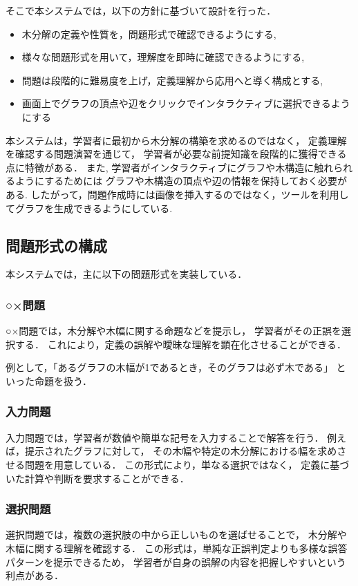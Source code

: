 \documentclass[technicalreport]{ieicej}
\begin{document}
そこで本システムでは，以下の方針に基づいて設計を行った．
\begin{itemize}
  \item 木分解の定義や性質を，問題形式で確認できるようにする,
  \item 様々な問題形式を用いて，理解度を即時に確認できるようにする, 
  \item 問題は段階的に難易度を上げ，定義理解から応用へと導く構成とする, 
  \item 画面上でグラフの頂点や辺をクリックでインタラクティブに選択できるようにする
\end{itemize}

本システムは，学習者に最初から木分解の構築を求めるのではなく，
定義理解を確認する問題演習を通じて，
学習者が必要な前提知識を段階的に獲得できる点に特徴がある．
また, 学習者がインタラクティブにグラフや木構造に触れられるようにするためには
グラフや木構造の頂点や辺の情報を保持しておく必要がある. 
したがって，問題作成時には画像を挿入するのではなく，ツールを利用してグラフを生成できるようにしている.

\subsection{問題形式の構成}
本システムでは，主に以下の問題形式を実装している．

\subsubsection{○×問題}
○×問題では，木分解や木幅に関する命題などを提示し，
学習者がその正誤を選択する．
これにより，定義の誤解や曖昧な理解を顕在化させることができる．

例として，「あるグラフの木幅が1であるとき，そのグラフは必ず木である」
といった命題を扱う．

\subsubsection{入力問題}
入力問題では，学習者が数値や簡単な記号を入力することで解答を行う．
例えば，提示されたグラフに対して，
その木幅や特定の木分解における幅を求めさせる問題を用意している．
この形式により，単なる選択ではなく，
定義に基づいた計算や判断を要求することができる．

\subsubsection{選択問題}
選択問題では，複数の選択肢の中から正しいものを選ばせることで，
木分解や木幅に関する理解を確認する．
この形式は，単純な正誤判定よりも多様な誤答パターンを提示できるため，
学習者が自身の誤解の内容を把握しやすいという利点がある．
\end{document}
